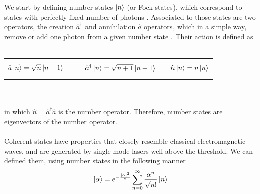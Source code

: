 We start by defining number states $\ket{n}$ (or Fock states), which correspond to states with perfectly fixed number of photons
\cite{loudon2000}.
Associated to those states are two operators, the creation $\hat{a}^\dagger$ and annihilation $\hat{a}$ operators, which in a simple way, remove or add one photon from a given number state
\cite{fox2006}.
Their action is defined as
\\
\\
\begin{tabular}{@{}ccccc}
	\begin{minipage}{4.3cm}
		\noindent
		\begin{equation}
			\hat{a} \ket{n} = \sqrt{n} \ket{n-1}
		\end{equation}
	\end{minipage}
	&
	&
	\begin{minipage}{5.6cm}
		\noindent
		\begin{equation}
			\quad \hat{a}^\dagger \ket{n} = \sqrt{n+1} \ket{n+1}
		\end{equation}
	\end{minipage}
	&
	&
	\begin{minipage}{3.5cm}
		\noindent
		\begin{equation}
			\hat{n} \ket{n} = n \ket{n}
		\end{equation}
	\end{minipage}
\end{tabular}
\\
\\
%
%
%
in which $\hat{n} = \hat{a}^\dagger\hat{a}$ is the number operator. Therefore, number states are eigenvectors of the number operator.\\
\\
Coherent states have properties that closely resemble classical electromagnetic waves, and are generated by single-mode lasers well above the threshold.
\cite{loudon2000}
We can defined them, using number states in the following manner
\begin{equation}
\ket{\alpha} = e^{-\frac{|\alpha|^2}{2}} \sum_{n=0}^\infty \frac{\alpha^n}{\sqrt{n!}} \ket{n}
\end{equation}
